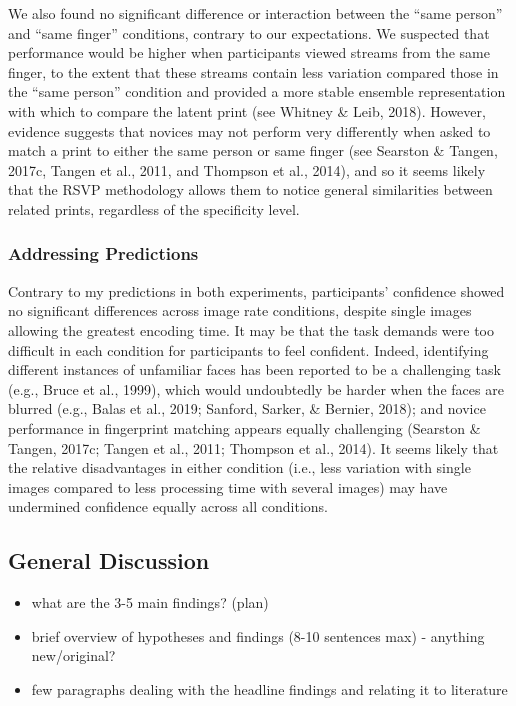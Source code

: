 \documentclass[
  english,
  man]{apa6}
\providecommand{\tightlist}{%
  \setlength{\itemsep}{0pt}\setlength{\parskip}{0pt}}
\begin{document}
We also found no significant difference or interaction between the ``same person'' and ``same finger'' conditions, contrary to our expectations. We suspected that performance would be higher when participants viewed streams from the same finger, to the extent that these streams contain less variation compared those in the ``same person'' condition and provided a more stable ensemble representation with which to compare the latent print (see Whitney \& Leib, 2018). However, evidence suggests that novices may not perform very differently when asked to match a print to either the same person or same finger (see Searston \& Tangen, 2017c, Tangen et al., 2011, and Thompson et al., 2014), and so it seems likely that the RSVP methodology allows them to notice general similarities between related prints, regardless of the specificity level.

\hypertarget{addressing-predictions}{%
\subsubsection{Addressing Predictions}\label{addressing-predictions}}

Contrary to my predictions in both experiments, participants' confidence showed no significant differences across image rate conditions, despite single images allowing the greatest encoding time. It may be that the task demands were too difficult in each condition for participants to feel confident. Indeed, identifying different instances of unfamiliar faces has been reported to be a challenging task (e.g., Bruce et al., 1999), which would undoubtedly be harder when the faces are blurred (e.g., Balas et al., 2019; Sanford, Sarker, \& Bernier, 2018); and novice performance in fingerprint matching appears equally challenging (Searston \& Tangen, 2017c; Tangen et al., 2011; Thompson et al., 2014). It seems likely that the relative disadvantages in either condition (i.e., less variation with single images compared to less processing time with several images) may have undermined confidence equally across all conditions.

\hypertarget{general-discussion}{%
\subsection{General Discussion}\label{general-discussion}}

\begin{itemize}
\tightlist
\item
  what are the 3-5 main findings? (plan)
\item
  brief overview of hypotheses and findings (8-10 sentences max) - anything new/original?
\item
  few paragraphs dealing with the headline findings and relating it to literature
\end{itemize}
\end{document}
